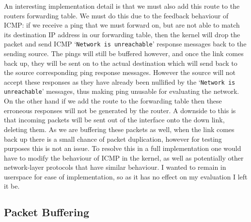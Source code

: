 \documentclass[withindex,glossary,openany]{cam-thesis}
\begin{document}
An interesting implementation detail is that we must also add this route to the routers forwarding table. We must do this due to the feedback behaviour of ICMP: if we receive a ping that we must forward on, but are not able to match its destination IP address in our forwarding table, then the kernel will drop the packet and send ICMP `\texttt{Network is unreachable}' response messages back to the sending source. The pings will still be buffered however, and once the link comes back up, they will be sent on to the actual destination which will send back to the source corresponding ping response messages. However the source will not accept these responses as they have already been nullified by the `\texttt{Network is unreachable}' messages, thus making ping unusable for evaluating the network. On the other hand if we add the route to the forwarding table then these erroneous responses will not be generated by the router. A downside to this is that incoming packets will be sent out of the interface onto the down link, deleting them. As we are buffering these packets as well, when the link comes back up there is a small chance of packet duplication, however for testing purposes this is not an issue. To resolve this in a full implementation one would have to modify the behaviour of ICMP in the kernel, as well as potentially other network-layer protocols that have similar behaviour. I wanted to remain in userspace for ease of implementation, so as it has no effect on my evaluation I left it be.


\subsection{Packet Buffering}
\end{document}
